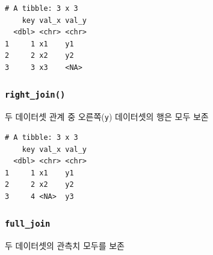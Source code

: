 \documentclass[
  11pt,
]{krantz}
\makeatletter
\newenvironment{Shaded}{\begin{snugshade}}{\end{snugshade}}
\newcommand{\DataTypeTok}[1]{\textcolor[rgb]{0.27,0.27,0.27}{#1}}
\newcommand{\KeywordTok}[1]{\textcolor[rgb]{0.27,0.27,0.27}{\textbf{#1}}}
\newcommand{\NormalTok}[1]{#1}
\newcommand{\OperatorTok}[1]{\textcolor[rgb]{0.43,0.43,0.43}{\textbf{#1}}}
\newcommand{\StringTok}[1]{\textcolor[rgb]{0.5,0.5,0.5}{#1}}
\newenvironment{kframe}{%
\medskip{}
\setlength{\fboxsep}{.8em}
 \def\at@end@of@kframe{}%
 \ifinner\ifhmode%
  \def\at@end@of@kframe{\end{minipage}}%
  \begin{minipage}{\columnwidth}%
 \fi\fi%
 \def\FrameCommand##1{\hskip\@totalleftmargin \hskip-\fboxsep
 \colorbox{shadecolor}{##1}\hskip-\fboxsep
     \hskip-\linewidth \hskip-\@totalleftmargin \hskip\columnwidth}%
 \MakeFramed {\advance\hsize-\width
   \@totalleftmargin\z@ \linewidth\hsize
   \@setminipage}}%
 {\par\unskip\endMakeFramed%
 \at@end@of@kframe}
\renewenvironment{quote}{\begin{kframe}}{\end{kframe}}
\makeatother
\begin{document}
\begin{verbatim}
# A tibble: 3 x 3
    key val_x val_y
  <dbl> <chr> <chr>
1     1 x1    y1   
2     2 x2    y2   
3     3 x3    <NA> 
\end{verbatim}

\normalsize

\hypertarget{right-join}{%
\subsubsection*{\texorpdfstring{\texttt{right\_join()}}{right\_join()}}\label{right-join}}


\begin{quote}
두 데이터셋 관계 중 오른쪽(\texttt{y}) 데이터셋의 행은 모두 보존
\end{quote}

\footnotesize

\begin{Shaded}
\end{Shaded}

\begin{verbatim}
# A tibble: 3 x 3
    key val_x val_y
  <dbl> <chr> <chr>
1     1 x1    y1   
2     2 x2    y2   
3     4 <NA>  y3   
\end{verbatim}

\normalsize

\hypertarget{full-join}{%
\subsubsection*{\texorpdfstring{\texttt{full\_join}}{full\_join}}\label{full-join}}


\begin{quote}
두 데이터셋의 관측치 모두를 보존
\end{quote}

\footnotesize

\begin{Shaded}
\end{Shaded}
\end{document}
